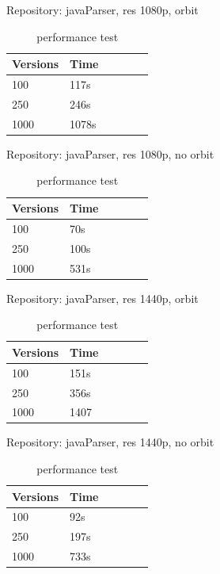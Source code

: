 \documentclass[]{usiinfbachelorproject}
\begin{document}
Repository: javaParser, res 1080p, orbit
\begin{table}[H]
    \begin{center}
        \begin{tabular}{ | l | l | l | l | l | l |}
        \hline
        Versions & Time \\ \hline
        100 & 117s\\ \hline
        250 & 246s\\ \hline
        1000 & 1078s\\ \hline
        \end{tabular}
    \end{center}
    \caption{performance test}
    \label{tab:performance}
\end{table}

Repository: javaParser, res 1080p, no orbit
\begin{table}[H]
    \begin{center}
        \begin{tabular}{ | l | l | l | l | l | l |}
        \hline
        Versions & Time \\ \hline
        100 & 70s\\ \hline
        250 & 100s\\ \hline
        1000 & 531s\\ \hline
        \end{tabular}
    \end{center}
    \caption{performance test}
    \label{tab:performance}
\end{table}

Repository: javaParser, res 1440p, orbit
\begin{table}[H]
    \begin{center}
        \begin{tabular}{ | l | l | l | l | l | l |}
        \hline
        Versions & Time \\ \hline
        100 & 151s\\ \hline
        250 & 356s\\ \hline
        1000 & 1407\\ \hline
        \end{tabular}
    \end{center}
    \caption{performance test}
    \label{tab:performance}
\end{table}

Repository: javaParser, res 1440p, no orbit
\begin{table}[H]
    \begin{center}
        \begin{tabular}{ | l | l | l | l | l | l |}
        \hline
        Versions & Time \\ \hline
        100 & 92s\\ \hline
        250 & 197s\\ \hline
        1000 & 733s\\ \hline
        \end{tabular}
    \end{center}
    \caption{performance test}
    \label{tab:performance}
\end{table}
\end{document}
